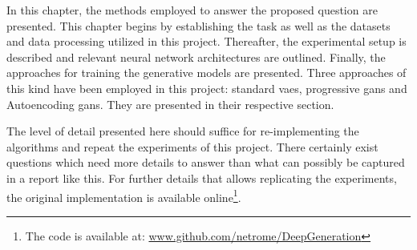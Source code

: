 In this chapter, the methods employed to answer the proposed question are presented. This chapter begins by establishing the task as well as the datasets and data processing utilized in this project. Thereafter, the experimental setup is described and relevant neural network architectures are outlined. Finally, the approaches for training the generative models are presented. Three approaches of this kind have been employed in this project: standard \acrfull{vaes}, progressive \acrfull{gans} and Autoencoding \acrfull{gans}. They are presented in their respective section. 

The level of detail presented here should suffice for re-implementing the algorithms and repeat the experiments of this project. There certainly exist questions which need more details to answer than what can possibly be captured in a report like this. For further details that allows replicating the experiments, the original implementation is available online\footnote{The code is available at: \url{www.github.com/netrome/DeepGeneration}}.

